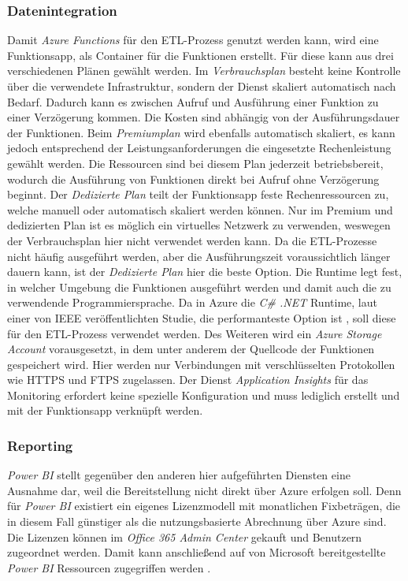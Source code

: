 \subsubsection{Datenintegration} \label{subsec:infra:konfig:functions}
Damit \textit{Azure Functions} für den ETL-Prozess genutzt werden kann, wird eine Funktionsapp, als Container für die Funktionen erstellt. Für diese kann aus drei verschiedenen Plänen gewählt werden. Im \textit{Verbrauchsplan} besteht keine Kontrolle über die verwendete Infrastruktur, sondern der Dienst skaliert automatisch nach Bedarf. Dadurch kann es zwischen Aufruf und Ausführung einer Funktion zu einer Verzögerung kommen. Die Kosten sind abhängig von der Ausführungsdauer der Funktionen. Beim \textit{Premiumplan} wird ebenfalls automatisch skaliert, es kann jedoch entsprechend der Leistungsanforderungen die eingesetzte Rechenleistung gewählt werden. Die Ressourcen sind bei diesem Plan jederzeit betriebsbereit, wodurch die Ausführung von Funktionen direkt bei Aufruf ohne Verzögerung beginnt. Der \textit{Dedizierte Plan} teilt der Funktionsapp feste Rechenressourcen zu, welche manuell oder automatisch skaliert werden können. Nur im Premium und dedizierten Plan ist es möglich ein virtuelles Netzwerk zu verwenden, weswegen der Verbrauchsplan hier nicht verwendet werden kann. Da die ETL-Prozesse nicht häufig ausgeführt werden, aber die Ausführungszeit voraussichtlich länger dauern kann, ist der \textit{Dedizierte Plan} hier die beste Option. Die Runtime legt fest, in welcher Umgebung die Funktionen ausgeführt werden und damit auch die zu verwendende Programmiersprache. Da in Azure die \textit{C\# .NET} Runtime, laut einer von IEEE veröffentlichten Studie, die performanteste Option ist \cite{jackson_investigation_2018}, soll diese für den ETL-Prozess verwendet werden. Des Weiteren wird ein \textit{Azure Storage Account} vorausgesetzt, in dem unter anderem der Quellcode der Funktionen gespeichert wird. Hier werden nur Verbindungen mit verschlüsselten Protokollen wie HTTPS und FTPS zugelassen. Der Dienst \textit{Application Insights} für das Monitoring erfordert keine spezielle Konfiguration und muss lediglich erstellt und mit der Funktionsapp verknüpft werden. \cite[vgl.][]{satapathi_hands-azure_2021}

\subsubsection{Reporting} \label{subsec:infra:konfig:powerbi}
\textit{Power BI} stellt gegenüber den anderen hier aufgeführten Diensten eine Ausnahme dar, weil die Bereitstellung nicht direkt über Azure erfolgen soll. Denn für  \textit{Power BI} existiert ein eigenes Lizenzmodell mit monatlichen Fixbeträgen, die in diesem Fall günstiger als die nutzungsbasierte Abrechnung über Azure sind. Die Lizenzen können im \textit{Office 365 Admin Center} gekauft und Benutzern zugeordnet werden. Damit kann anschließend auf von Microsoft bereitgestellte \textit{Power BI} Ressourcen zugegriffen werden \cite[vgl.][]{gunnarsson_pro_2020}.

